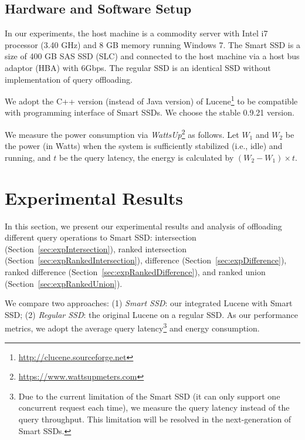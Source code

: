 \subsection{Hardware and Software Setup}\label{sec:hwswsetup}
In our experiments, the host machine is a commodity server with Intel i7 processor (3.40 GHz) and 8 GB memory running Windows 7.
The Smart SSD is a size of 400 GB SAS SSD (SLC) and connected to the host machine via a host bus adaptor (HBA) with 6Gbps. The regular SSD is an identical SSD without implementation of query offloading.

We adopt the C++ version (instead of Java version) of Lucene\footnote{\small\url{http://clucene.sourceforge.net}} to be compatible with programming interface of Smart SSDs. We choose the stable 0.9.21 version.

We measure the power consumption via \emph{WattsUp}\footnote{\small \url{https://www.wattsupmeters.com}} as follows. Let $W_1$ and $W_2$ be the power (in Watts) when the system is sufficiently stabilized (i.e., idle) and running, and $t$ be the query latency, the energy is calculated by $(W_2-W_1)\times t$.




\section{Experimental Results}\label{sec:expResults}
In this section, we present our experimental results and analysis of offloading different query operations to Smart SSD: \textsf{intersection} (Section~\ref{sec:expIntersection}), \textsf{ranked intersection} (Section~\ref{sec:expRankedIntersection}),
\textsf{difference} (Section~\ref{sec:expDifference}), \textsf{ranked difference} (Section~\ref{sec:expRankedDifference}), and \textsf{ranked union} (Section~\ref{sec:expRankedUnion}).

We compare two approaches: (1) \emph{Smart SSD}: our integrated Lucene with Smart SSD; (2) \emph{Regular SSD}: the original Lucene on a regular SSD. As our performance metrics, we adopt the average query latency\footnote{\small Due to the current limitation of the Smart SSD (it can only support one concurrent request each time), we measure the query latency instead of the query throughput. This limitation will be resolved in the next-generation of Smart SSDs.} and energy consumption.


